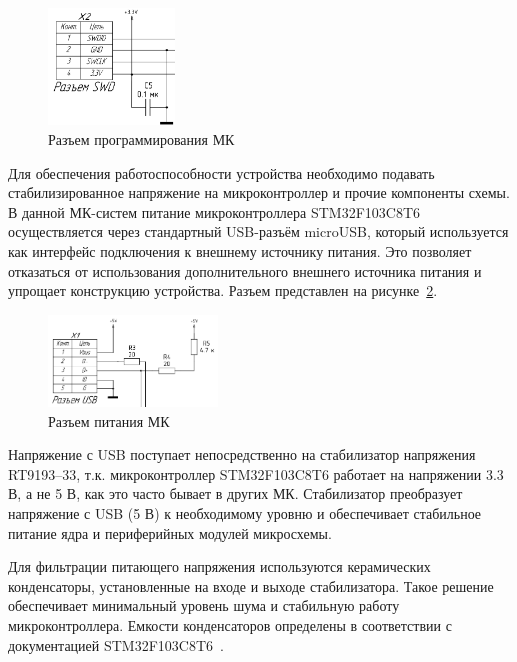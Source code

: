 \begin{figure}[H]
    \centering
    \includegraphics[width=0.3\textwidth]{images/design/swd}
    \caption{\centering Разъем программирования МК}
    \label{fig:swd}
\end{figure}


Для обеспечения работоспособности устройства необходимо подавать стабилизированное напряжение на микроконтроллер и прочие компоненты схемы.
В данной МК-систем питание микроконтроллера STM32F103C8T6 осуществляется через стандартный USB-разъём microUSB, который используется как интерфейс подключения к внешнему источнику питания.
Это позволяет отказаться от использования дополнительного внешнего источника питания и упрощает конструкцию устройства.
Разъем представлен на рисунке~\ref{fig:usb}.

\begin{figure}[H]
    \centering
    \includegraphics[width=0.4\textwidth]{images/design/usb}
    \caption{\centering Разъем питания МК}
    \label{fig:usb}
\end{figure}

Напряжение с USB поступает непосредственно на стабилизатор напряжения RT9193--33, т.к. микроконтроллер STM32F103C8T6 работает на напряжении 3.3 В, а не 5 В, как это часто бывает в других МК.
Стабилизатор преобразует напряжение с USB (5 В) к необходимому уровню и обеспечивает стабильное питание ядра и периферийных модулей микросхемы.

Для фильтрации питающего напряжения используются керамических конденсаторы, установленные на входе и выходе стабилизатора.
Такое решение обеспечивает минимальный уровень шума и стабильную работу микроконтроллера.
Емкости конденсаторов определены в соответствии с документацией STM32F103C8T6~\cite{stm32f103_datasheet}.


